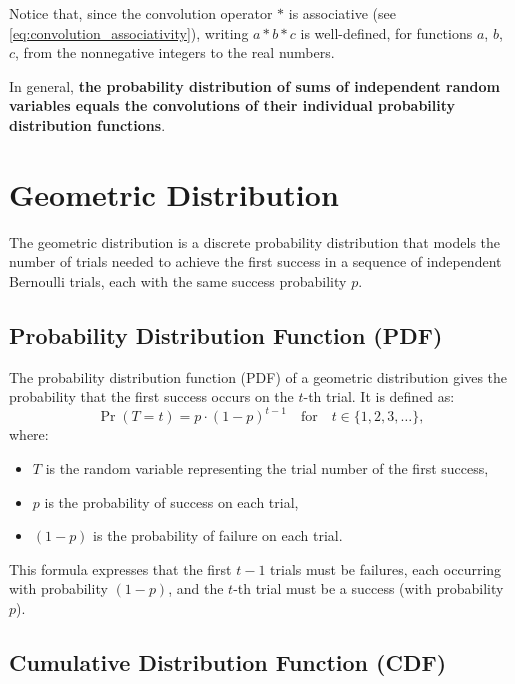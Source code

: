 \documentclass{masterthesis}
\begin{document}
Notice that, since the convolution operator $*$ is associative (see \ref{eq:convolution_associativity}), writing $a * b * c$ is well-defined, for functions $a$, $b$, $c$, from the nonnegative integers to the real numbers.

In general, \textbf{the probability distribution of sums of independent random variables equals the convolutions of their individual probability distribution functions}.

\section*{Geometric Distribution}\label{section:geometric_distribution}

The geometric distribution is a discrete probability distribution that models the number of trials needed to achieve the first success in a sequence of independent Bernoulli trials, each with the same success probability $p$.

\subsection*{Probability Distribution Function (PDF)}\label{subsection:geometric_pdf}

The probability distribution function (PDF) of a geometric distribution gives the probability that the first success occurs on the $t$-th trial. It is defined as:
\begin{equation}
    \Pr(T = t) = p \cdot (1 - p)^{t-1} \quad \text{for} \quad t \in \{1, 2, 3, \ldots \},
\end{equation}
where:
\begin{itemize}
    \item $T$ is the random variable representing the trial number of the first success,
    \item $p$ is the probability of success on each trial,
    \item $(1 - p)$ is the probability of failure on each trial.
\end{itemize}

This formula expresses that the first $t-1$ trials must be failures, each occurring with probability $(1-p)$, and the $t$-th trial must be a success (with probability $p$).

\subsection*{Cumulative Distribution Function (CDF)}\label{subsection:geometric_cdf}
\end{document}
